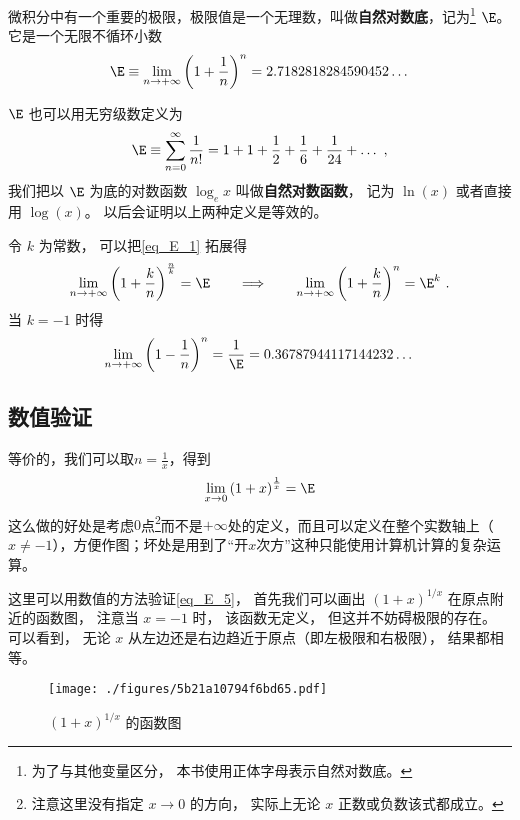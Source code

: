
微积分中有一个重要的极限，极限值是一个无理数，叫做\textbf{自然对数底}，记为\footnote{为了与其他变量区分， 本书使用正体字母表示自然对数底。} $\E$。 它是一个无限不循环小数
\begin{equation}\label{eq_E_1}
\E \equiv \lim_{n \to +\infty} \left(1 + \frac{1}{n}\right)^n = 2.7182818284590452\dots
\end{equation}

$\E$ 也可以用无穷级数定义为
\begin{equation}\label{eq_E_2}
\E \equiv \sum_{n=0}^\infty \frac{1}{n!} = 1 + 1 + \frac{1}{2} + \frac{1}{6} + \frac{1}{24} +\dots~,
\end{equation}
我们把以 $\E$ 为底的对数函数 $\log_e x$ 叫做\textbf{自然对数函数}， 记为 $\ln(x)$ 或者直接用 $\log(x)$。 以后会证明以上两种定义是等效的。

令 $k$ 为常数， 可以把\autoref{eq_E_1} 拓展得
\begin{equation}\label{eq_E_4}
\lim_{n \to +\infty} \left(1 + \frac{k}{n}\right)^{\frac{n}{k}} = \E
\qquad \Longrightarrow\qquad
\lim_{n \to +\infty} \left(1 + \frac{k}{n}\right)^n = \E^k~.
\end{equation}
当 $k = -1$ 时得
\begin{equation}\label{eq_E_3}
\lim_{n \to +\infty} \left(1 - \frac{1}{n}\right)^n = \frac{1}{\E} = 0.36787944117144232\dots
\end{equation}

\subsection{数值验证}
等价的，我们可以取$n = \frac{1}{x}$，得到
\begin{equation}\label{eq_E_5}
\lim_{x \to 0} \left(1 + x\right)^{\frac{1}{x}} = \E
\end{equation}
这么做的好处是考虑$0$点\footnote{注意这里没有指定 $x\to 0$ 的方向， 实际上无论 $x$ 正数或负数该式都成立。}而不是$+\infty$处的定义，而且可以定义在整个实数轴上（$x \neq -1$），方便作图；坏处是用到了“开$x$次方”这种只能使用计算机计算的复杂运算。

这里可以用数值的方法验证\autoref{eq_E_5}， 首先我们可以画出 $(1+x)^{1/x}$ 在原点附近的函数图， 注意当 $x = -1$ 时， 该函数无定义， 但这并不妨碍极限的存在。 可以看到， 无论 $x$ 从左边还是右边趋近于原点（即左极限和右极限）， 结果都相等。
\begin{figure}[ht]
\centering
\texttt{[image: ./figures/5b21a10794f6bd65.pdf]}
\caption{$(1+x)^{1/x}$ 的函数图} \label{fig_E_1}
\end{figure}

